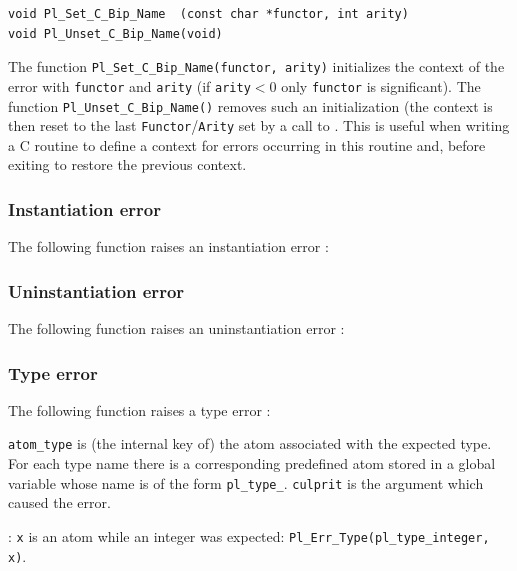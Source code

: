 \begin{Code}
\begin{verbatim}
void Pl_Set_C_Bip_Name  (const char *functor, int arity)
void Pl_Unset_C_Bip_Name(void)
\end{verbatim}
\end{Code}

The function \texttt{Pl\_Set\_C\_Bip\_Name(functor, arity)} initializes the
context of the error with \texttt{functor} and \texttt{arity} (if
\texttt{arity}$<$0 only \texttt{functor} is significant). The function
\texttt{Pl\_Unset\_C\_Bip\_Name()} removes such an initialization (the context
is then reset to the last \texttt{Functor}/\texttt{Arity} set by a call to
 . This is useful when
writing a C routine to define a context for errors occurring in this routine
and, before exiting to restore the previous context.

\subsubsection{Instantiation error}
The following function raises an instantiation error :


\subsubsection{Uninstantiation error}
The following function raises an uninstantiation error :


\subsubsection{Type error}
The following function raises a type error :


\texttt{atom\_type} is (the internal key of) the atom associated with the
expected type. For each type name  there is a
corresponding predefined atom stored in a global variable whose name is of
the form \texttt{pl\_type\_}. \texttt{culprit} is the argument which
caused the error.

: \texttt{x} is an atom while an integer was expected:
\texttt{Pl\_Err\_Type(pl\_type\_integer, x)}.


